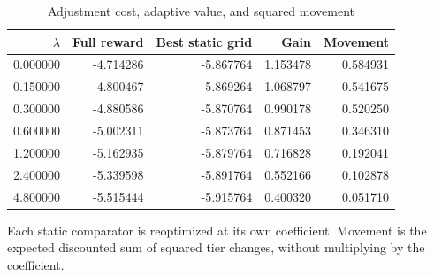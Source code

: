 \begin{table}[htbp]
\centering
\caption{Adjustment cost, adaptive value, and squared movement}\label{tab:r6sensitivity}
\small
\begin{tabular}{rrrrr}
\toprule
$\lambda$ & Full reward & Best static grid & Gain & Movement \\
\midrule
0.000000 & -4.714286 & -5.867764 & 1.153478 & 0.584931 \\
0.150000 & -4.800467 & -5.869264 & 1.068797 & 0.541675 \\
0.300000 & -4.880586 & -5.870764 & 0.990178 & 0.520250 \\
0.600000 & -5.002311 & -5.873764 & 0.871453 & 0.346310 \\
1.200000 & -5.162935 & -5.879764 & 0.716828 & 0.192041 \\
2.400000 & -5.339598 & -5.891764 & 0.552166 & 0.102878 \\
4.800000 & -5.515444 & -5.915764 & 0.400320 & 0.051710 \\
\bottomrule
\end{tabular}
\par\smallskip\begin{minipage}{0.96\textwidth}\footnotesize Each static comparator is reoptimized at its own coefficient. Movement is the expected discounted sum of squared tier changes, without multiplying by the coefficient.\end{minipage}
\end{table}

